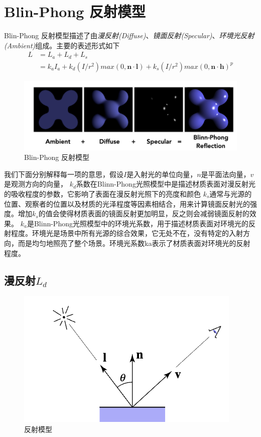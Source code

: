 \section{Blin-Phong 反射模型}

Blin-Phong 反射模型描述了由\textsl{漫反射(Diffuse)}、\textsl{镜面反射(Specular)}、\textsl{环境光反射(Ambient)}组成。主要的表述形式如下
\begin{equation}
    \begin{aligned}
          L&=L_a+L_d+L_s\\
          &=k_aI_a+k_d(I/r^2)max(0,\mathbf{n}\cdot \mathbf{l})+k_s(I/r^2)max(0,\mathbf{n}\cdot \mathbf{h})^p
    \end{aligned}
\end{equation}

\begin{figure}[H]
    \centering
    \includegraphics[scale=0.45]{figures/反射模型.png}
    \caption[short]{Blin-Phong 反射模型}
\end{figure}

我们下面分别解释每一项的意思，假设$I$是入射光的单位向量，$n$是平面法向量，$v$是观测方向的向量，
$k_d$系数在Blinn-Phong光照模型中是描述材质表面对漫反射光的吸收程度的参数，它影响了表面在漫反射光照下的亮度和颜色
$k_s$通常与光源的位置、观察者的位置以及材质的光泽程度等因素相结合，用来计算镜面反射光的强度。增加$k_s$的值会使得材质表面的镜面反射更加明显，反之则会减弱镜面反射的效果。
$k_a$是Blinn-Phong光照模型中的环境光系数，用于描述材质表面对环境光的反射程度。环境光是场景中所有光源的综合效果，它无处不在，没有特定的入射方向，而是均匀地照亮了整个场景。环境光系数ka表示了材质表面对环境光的反射程度。

\subsection*{漫反射$L_d$}

\begin{figure}[H]
    \centering
    \includegraphics[scale=0.45]{figures/漫反射.png}
    \caption[short]{反射模型}
\end{figure}

